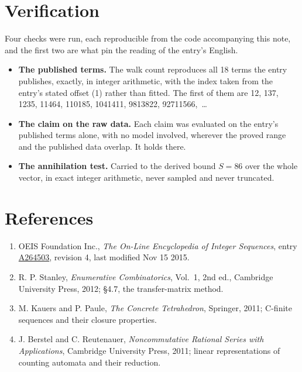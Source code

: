 \documentclass[11pt]{article}
\theoremstyle{definition}
\begin{document}
\section{Verification}

Four checks were run, each reproducible from the code accompanying this note, and the first two are what pin the reading of the entry's English.

\begin{itemize}

\item {\bfseries The published terms.} The walk count reproduces all 18 terms the entry publishes, exactly, in integer arithmetic, with the index taken from the entry's stated offset (1) rather than fitted. The first of them are 12, 137, 1235, 11464, 110185, 1041411, 9813822, 92711566,~\dots

\item {\bfseries The claim on the raw data.} Each claim was evaluated on the entry's published terms alone, with no model involved, wherever the proved range and the published data overlap. It holds there.

\item {\bfseries The annihilation test.} Carried to the derived bound $S = 86$ over the whole vector, in exact integer arithmetic, never sampled and never truncated.

\end{itemize}

\section{References}

\begin{enumerate}

\item OEIS Foundation Inc., \emph{The On-Line Encyclopedia of Integer Sequences}, entry \href{https://oeis.org/A264503}{A264503}, revision 4, last modified Nov 15 2015.

\item R. P. Stanley, \emph{Enumerative Combinatorics}, Vol.~1, 2nd ed., Cambridge University Press, 2012; \S4.7, the transfer-matrix method.

\item M. Kauers and P. Paule, \emph{The Concrete Tetrahedron}, Springer, 2011; C-finite sequences and their closure properties.

\item J. Berstel and C. Reutenauer, \emph{Noncommutative Rational Series with Applications}, Cambridge University Press, 2011; linear representations of counting automata and their reduction.

\end{enumerate}
\end{document}
